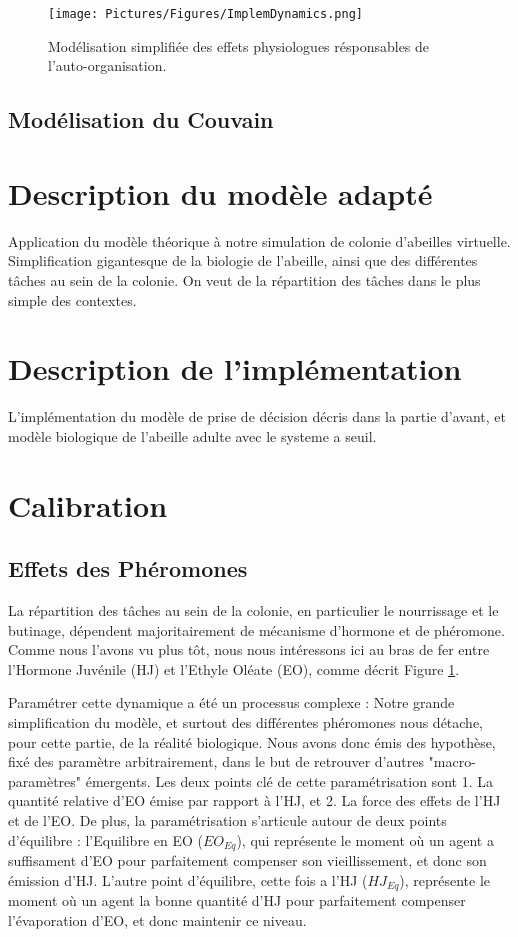 \documentclass[11pt,a4paper]{report}
\begin{document}
			
			\begin{figure}
			\centering
			\texttt{[image: Pictures/Figures/ImplemDynamics.png]}
			\caption{Modélisation simplifiée des effets physiologues résponsables de l'auto-organisation.}
			\label{HJEODynamics}
			\end{figure}
		
		
		\subsection{Modélisation du Couvain}
	\section{Description du modèle adapté}
		Application du modèle théorique à notre simulation de colonie d'abeilles virtuelle.
		Simplification gigantesque de la biologie de l'abeille, ainsi que des différentes tâches au sein de la colonie.
		On veut de la répartition des tâches dans le plus simple des contextes.
	\section{Description de l'implémentation}
		L'implémentation du modèle de prise de décision décris dans la partie d'avant, et modèle biologique de l'abeille adulte avec le systeme a seuil.
	\section{Calibration}
	
	\subsection{Effets des Phéromones}
	
	La répartition des tâches au sein de la colonie, en particulier le nourrissage et le butinage, dépendent majoritairement de mécanisme d'hormone et de phéromone. Comme nous l'avons vu plus tôt, nous nous intéressons ici au bras de fer entre l'Hormone Juvénile (HJ) et l'Ethyle Oléate (EO), comme décrit Figure \ref{HJEODynamics}.
	
	Paramétrer cette dynamique a été un processus complexe : Notre grande simplification du modèle, et surtout des différentes phéromones nous détache, pour cette partie, de la réalité biologique. Nous avons donc émis des hypothèse, fixé des paramètre arbitrairement, dans le but de retrouver d'autres "macro-paramètres" émergents. Les deux points clé de cette paramétrisation sont 1. La quantité relative d'EO émise par rapport à l'HJ, et 2. La force des effets de l'HJ et de l'EO. De plus, la paramétrisation s'articule autour de deux points d'équilibre : l'Equilibre en EO ($EO_{Eq}$), qui représente le moment où un agent a suffisament d'EO pour parfaitement compenser son vieillissement, et donc son émission d'HJ. L'autre point d'équilibre, cette fois a l'HJ ($HJ_{Eq}$), représente le moment où un agent la bonne quantité d'HJ pour parfaitement compenser l'évaporation d'EO, et donc maintenir ce niveau.
	
\end{document}
